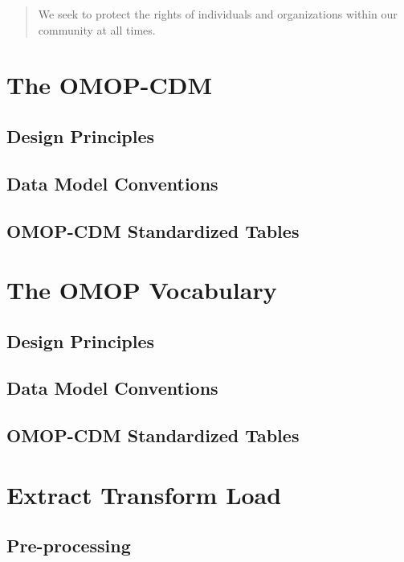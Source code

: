 \documentclass[]{book}
\begin{document}
\begin{quote}
We seek to protect the rights of individuals and organizations within
our community at all times.
\end{quote}

\chapter{The OMOP-CDM}\label{omopCdm}

\section{Design Principles}\label{design-principles}

\section{Data Model Conventions}\label{data-model-conventions}

\section{OMOP-CDM Standardized
Tables}\label{omop-cdm-standardized-tables}

\chapter{The OMOP Vocabulary}\label{omopVoca}

\section{Design Principles}\label{design-principles-1}

\section{Data Model Conventions}\label{data-model-conventions-1}

\section{OMOP-CDM Standardized
Tables}\label{omop-cdm-standardized-tables-1}

\chapter{Extract Transform Load}\label{etl}

\section{Pre-processing}\label{pre-processing}
\end{document}
